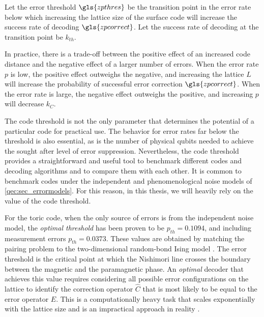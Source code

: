 \begin{definition}\label{def:pthres}
  Let the error threshold $\gls{zpthres}$ be the transition point in the error rate below which increasing the lattice size of the surface code will increase the success rate of decoding $\gls{zpcorrect}$. Let the success rate of decoding at the transition point be $k_{th}$. 
\end{definition}

In practice, there is a trade-off between the positive effect of an increased code distance and the negative effect of a larger number of errors. When the error rate $p$ is low, the positive effect outweighs the negative, and increasing the lattice $L$ will increase the probability of successful error correction $\gls{zpcorrect}$. When the error rate is large, the negative effect outweighs the positive, and increasing $p$ will decrease $k_C$. 

The code threshold is not the only parameter that determines the potential of a particular code for practical use. The behavior for error rates far below the threshold is also essential, as is the number of physical qubits needed to achieve the sought after level of error suppression. Nevertheless, the code threshold provides a straightforward and useful tool to benchmark different codes and decoding algorithms and to compare them with each other. It is common to benchmark codes under the independent and phenomenological noise models of \ref{qec:sec_errormodels}. For this reason, in this thesis, we will heavily rely on the value of the code threshold. 

For the toric code, when the only source of errors is from the independent noise model, the \emph{optimal threshold} has been proven to be $p_{th}=0.1094$, and including measurement errors $p_{th} = 0.0373$. These values are obtained by matching the pairing problem to the two-dimensional random-bond Ising model \cite{dennis2002topological}. The error threshold is the critical point at which the Nishimori line crosses the boundary between the magnetic and the paramagnetic phase. An \emph{optimal} decoder that achieves this value requires considering all possible error configurations on the lattice to identify the correction operator $\hat{C}$ that is most likely to be equal to the error operator $\hat{E}$. This is a computationally heavy task that scales exponentially with the lattice size and is an impractical approach in reality \cite{bravyi2014efficient, heim2016optimal}.

